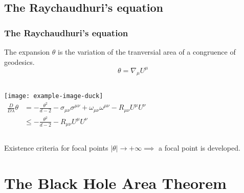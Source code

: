 \documentclass[handout]{beamer}
\begin{document}
	\subsection{The Raychaudhuri's equation}
	\begin{frame}
		\frametitle{The Raychaudhuri's equation}
		\begin{defblock}{The expansion}
			\(\theta\) is the variation of the tranversial area of a congruence of geodesics.
			\[
			\theta = \nabla_{\mu}U^{\mu}	
			\]
		\end{defblock}
		\vskip 10pt
		\begin{columns}
			\centering
				\texttt{[image: example-image-duck]}
			\begin{align*}
				\frac{D}{D\lambda}\theta &= -\frac{\theta^2}{d - 2} - \sigma_{\mu\nu}\sigma^{\mu\nu} + \omega_{\mu\nu}\omega^{\mu\nu}  - R_{\mu\nu}U^{\mu}U^{\nu} \\
				&\le -\frac{\theta^2}{d - 2} - R_{\mu\nu}U^{\mu}U^{\nu}
			\end{align*}
		\end{columns}
		\vskip 10pt
		\begin{ideablock}{Existence criteria for focal points}
			\centering
			\(\vert\theta\vert \rightarrow +\infty \implies \) 
			a focal point is developed.
		\end{ideablock}
	\end{frame}

	\section{The Black Hole Area Theorem}
\end{document}
